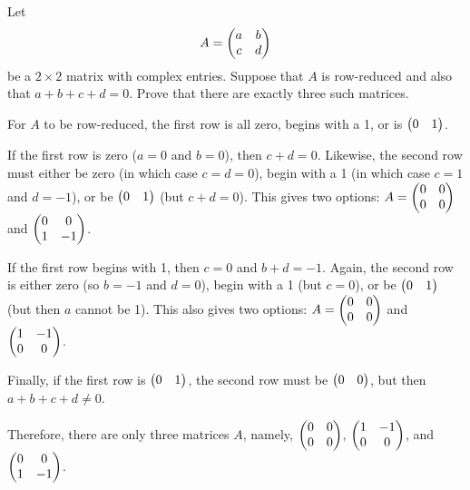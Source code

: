 \begin{xca}
  Let \[ A = \mqty(a&b\\c&d) \] be a $2 \times 2$ matrix with complex entries.
  Suppose that $A$ is row-reduced and also that $a+b+c+d=0$.
  Prove that there are exactly three such matrices.
\end{xca}
\begin{prf}
  For $A$ to be row-reduced, the first row is all zero, begins with a 1, or is $\mqty(0&1)$.

  If the first row is zero ($a = 0$ and $b = 0$), then $c+d = 0$.
  Likewise, the second row must either be zero (in which case $c = d = 0$),
  begin with a 1 (in which case $c = 1$ and $d = -1$),
  or be $\mqty(0&1)$ (but $c+d = 0$).
  This gives two options: $A = \mqty(0&0\\0&0)$ and $\mqty(0&0\\1&-1)$.

  If the first row begins with 1, then $c = 0$ and $b+d = -1$.
  Again, the second row is either zero (so $b = -1$ and $d = 0$),
  begin with a 1 (but $c = 0$),
  or be $\mqty(0&1)$ (but then $a$ cannot be 1).
  This also gives two options: $A = \mqty(0&0\\0&0)$ and $\mqty(1&-1\\0&0)$.

  Finally, if the first row is $\mqty(0&1)$, the second row must be $\mqty(0&0)$,
  but then $a+b+c+d \neq 0$.

  Therefore, there are only three matrices $A$, namely,
  $\mqty(0&0\\0&0)$, $\mqty(1&-1\\0&0)$, and $\mqty(0&0\\1&-1)$.
\end{prf}

